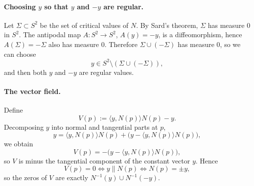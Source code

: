 \documentclass[12pt,a4paper]{article}
\theoremstyle{plain}
\theoremstyle{definition}      %
\begin{document}
\paragraph{Choosing $y$ so that $y$ and $-y$ are regular.}
Let $\Sigma\subset S^{2}$ be the set of critical values of $N$.
By Sard's theorem, $\Sigma$ has measure $0$ in $S^{2}$.
The antipodal map $A\colon S^{2}\to S^{2}$, $A(y)=-y$, is a diffeomorphism, hence
$A(\Sigma)=-\Sigma$ also has measure $0$.
Therefore $\Sigma\cup(-\Sigma)$ has measure $0$, so we can choose
\[
y\in S^{2}\setminus(\Sigma\cup(-\Sigma)),
\]
and then both $y$ and $-y$ are regular values.

\paragraph{The vector field.}
Define
\[
V(p):=\langle y,N(p)\rangle N(p)-y.
\]
Decomposing $y$ into normal and tangential parts at $p$,
\[
y=\langle y,N(p)\rangle N(p)+\bigl(y-\langle y,N(p)\rangle N(p)\bigr),
\]
we obtain
\[
V(p)= -\bigl(y-\langle y,N(p)\rangle N(p)\bigr),
\]
so $V$ is minus the tangential component of the constant vector $y$.
Hence
\[
V(p)=0 \iff y \parallel N(p) \iff N(p)=\pm y,
\]
so the zeros of $V$ are exactly $N^{-1}(y)\cup N^{-1}(-y)$.
\end{document}
